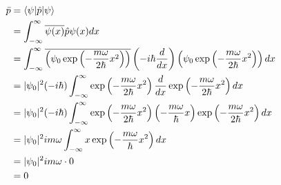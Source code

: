 \documentclass{article}
\begin{document}
  \begin{align*}
      \Bar{p} &= \langle\psi|\hat{p}|\psi\rangle\\
      &= \int_{-\infty}^\infty\overline{\psi(x)}\hat{p}\psi(x)dx\\
      &= \int_{-\infty}^\infty\overline{\left(\psi_0\exp\left(-\frac{m\omega}{2\hbar}x^2\right)\right)}\left(-i\hbar\frac{d}{dx}\right)\left(\psi_0\exp\left(-\frac{m\omega}{2\hbar}x^2\right)\right)dx\\
      &= |\psi_0|^2(-i\hbar)\int_{-\infty}^\infty \exp\left(-\frac{m\omega}{2\hbar}x^2\right) \frac{d}{dx} \exp\left(-\frac{m\omega}{2\hbar}x^2\right) dx\\
      &= |\psi_0|^2(-i\hbar)\int_{-\infty}^\infty \exp\left(-\frac{m\omega}{2\hbar}x^2\right) \left(-\frac{m\omega}{\hbar}x\right) \exp\left(-\frac{m\omega}{2\hbar}x^2\right) dx\\
      &= |\psi_0|^2 im\omega \int_{-\infty}^\infty x\exp\left(-\frac{m\omega}{\hbar}x^2\right)dx\\
      &= |\psi_0|^2 im\omega \cdot 0\\
      &= 0
  \end{align*}
\end{document}

